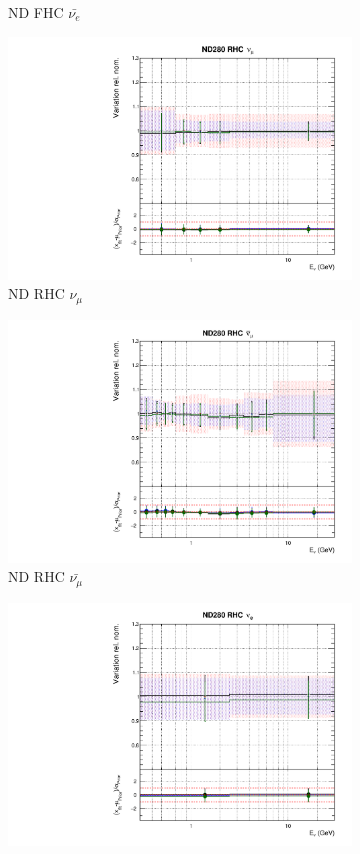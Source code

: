 \begin{figure}[!htbp]
\begin{subfigure}{0.45\textwidth}
  \caption{ND FHC $\bar{\nu_{e}}$}
\end{subfigure}
\begin{subfigure}{0.45\textwidth}
  \centering
  \includegraphics[width=0.75\linewidth]{figs/polyasmvsflux_4}
  \caption{ND RHC $\nu_{\mu}$}
\end{subfigure}
\begin{subfigure}{0.45\textwidth}
  \centering
  \includegraphics[width=0.75\linewidth]{figs/polyasmvsflux_5}
  \caption{ND RHC $\bar{\nu_{\mu}}$}
\end{subfigure}
\begin{subfigure}{0.45\textwidth}
  \centering
  \includegraphics[width=0.75\linewidth]{figs/polyasmvsflux_6}

\end{subfigure}
\end{figure}
